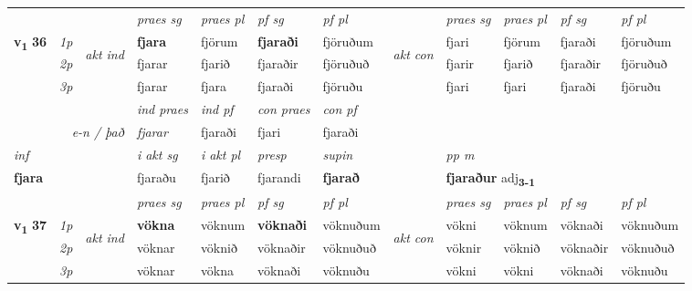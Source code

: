 \begin{longtable}[l]{X>{\footnotesize\itshape}llXXXXlXXXX}
 & &   & \textit{praes sg}  & \textit{praes pl}    & \textit{ pf sg} & \textit{pf pl} & & \textit{praes sg}  & \textit{praes pl}    & \textit{pf sg} & \textit{pf pl }  \\ \cmidrule{4-7} \cmidrule{9-12}
 \multirow{2}{*}{{{\textbf{v{\textsubscript{1}}} \Large{\textbf{36}}}}}  & 1p & \multirow{3}{*}{\begin{turn}{90}\textit{akt ind}\end{turn}} & \textbf{fjara} & fjörum & \textbf{fjaraði} & fjöruðum & \multirow{3}{*}{\begin{turn}{90}\textit{akt con}\end{turn}} &fjari & fjörum & fjaraði & fjöruðum\\*
 & 2p &  &  fjarar  & fjarið & fjaraðir & fjöruðuð & & fjarir & fjarið & fjaraðir & fjöruðuð \\*
 & 3p &  & fjarar & fjara & fjaraði & fjöruðu & & fjari & fjari& fjaraði & fjöruðu \\*
\cmidrule{4-7} \cmidrule{9-12}

   && &  \textit{ind praes} & \textit{ind pf} & \textit{con praes} & \textit{con pf} \\*
\multicolumn{3}{r}{\textit{e-n / það}} & fjarar & fjaraði & fjari & fjaraði \\*

\cmidrule{4-7}
   {\textit{inf}} & &  & \textit{i akt sg} & \textit{i akt pl}   & \textit{presp} & \textit{supin}  && \textit{pp m} \\*
  {\textbf{fjara}} & && fjaraðu  & fjarið   & fjarandi &  \textbf{fjarað}  && \multicolumn{2}{l}{\textbf{fjaraður} adj\textbf{\textsubscript{3-1}}} \\*

\midrule

 & &   & \textit{praes sg}  & \textit{praes pl}    & \textit{ pf sg} & \textit{pf pl} & & \textit{praes sg}  & \textit{praes pl}    & \textit{pf sg} & \textit{pf pl }  \\ \cmidrule{4-7} \cmidrule{9-12}
 \multirow{2}{*}{{{\textbf{v{\textsubscript{1}}} \Large{\textbf{37}}}}}  & 1p & \multirow{3}{*}{\begin{turn}{90}\textit{akt ind}\end{turn}} & \textbf{vökna} & vöknum & \textbf{vöknaði} & vöknuðum & \multirow{3}{*}{\begin{turn}{90}\textit{akt con}\end{turn}} &vökni & vöknum & vöknaði & vöknuðum\\*
 & 2p &  &  vöknar  & vöknið & vöknaðir & vöknuðuð & & vöknir & vöknið & vöknaðir & vöknuðuð \\*
 & 3p &  & vöknar & vökna & vöknaði & vöknuðu & & vökni & vökni& vöknaði & vöknuðu \\*
\cmidrule{4-7} \cmidrule{9-12}


\end{longtable}

